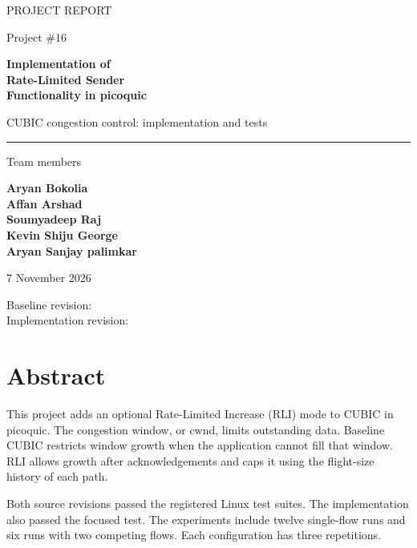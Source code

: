 \documentclass[11pt,a4paper]{article}
\newcommand{\code}[1]{\texttt{\detokenize{#1}}}
\begin{document}
\hypersetup{pageanchor=false}
\begin{titlepage}
\centering
\vspace*{10mm}
{\Large\color{accent} PROJECT REPORT}\par
\vspace{7mm}
{\large Project \#16}\par
\vspace{10mm}
{\Huge\bfseries Implementation of\\[3mm] Rate-Limited Sender\\[3mm] Functionality in picoquic}\par
\vspace{8mm}
{\Large CUBIC congestion control: implementation and tests}\par
\vspace{12mm}
\rule{0.8\textwidth}{0.7pt}\par
\vspace{7mm}
{\large Team members}\par
\vspace{3mm}
{\Large\bfseries Aryan Bokolia\\[2mm]
Affan Arshad\\[2mm]
Soumyadeep Raj\\[2mm]
Kevin Shiju George\\[2mm]
Aryan Sanjay palimkar}\par
\vspace{7mm}
{\large 7 November 2026}\par
\vspace{6mm}
{\normalsize Baseline revision: \texttt{\BaselineCommit}\\
Implementation revision: \texttt{\ImplementationCommit}}\par
\vfill
\end{titlepage}
\hypersetup{pageanchor=true}

\section*{Abstract}
This project adds an optional Rate-Limited Increase (RLI) mode to CUBIC in picoquic.
The congestion window, or cwnd, limits outstanding data.
Baseline CUBIC restricts window growth when the application cannot fill that window.
RLI allows growth after acknowledgements and caps it using the flight-size history of each path.

Both source revisions passed the registered Linux test suites.
The implementation also passed the focused \code{cubic_rli} test.
The experiments include twelve single-flow runs and six runs with two competing flows.
Each configuration has three repetitions.
\end{document}
